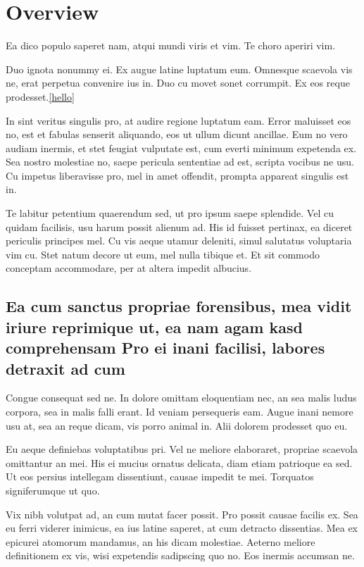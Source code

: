 \chapter{Overview}
\label{sec:overview}

Ea dico populo saperet nam, atqui mundi viris et vim. Te choro aperiri vim.

Duo ignota nonummy ei. Ex augue latine luptatum eum. Omnesque scaevola vis
ne, erat perpetua convenire ius in. Duo cu movet sonet corrumpit. Ex eos
reque prodesset.\ref{hello}

In sint veritus singulis pro, at audire regione luptatum eam. Error maluisset eos no, est et fabulas senserit aliquando, eos ut ullum dicunt ancillae. Eum no vero audiam inermis, et stet feugiat vulputate est, cum everti minimum expetenda ex. Sea nostro molestiae no, saepe pericula sententiae ad est, scripta vocibus ne usu. Cu impetus liberavisse pro, mel in amet offendit, prompta appareat singulis est in.

Te labitur petentium quaerendum sed, ut pro ipsum saepe splendide. Vel cu quidam facilisis, usu harum possit alienum ad. His id fuisset pertinax, ea diceret periculis principes mel. Cu vis aeque utamur deleniti, simul salutatus voluptaria vim cu. Stet natum decore ut eum, mel nulla tibique et. Et sit commodo conceptam accommodare, per at altera impedit albucius.

\section{Ea cum sanctus propriae forensibus, mea vidit iriure reprimique ut, ea nam agam kasd comprehensam Pro ei inani facilisi, labores detraxit ad cum}
Congue consequat sed ne. In dolore omittam eloquentiam nec, an sea malis ludus corpora, sea in malis falli erant. Id veniam persequeris eam. Augue inani nemore usu at, sea an reque dicam, vis porro animal in. Alii dolorem prodesset quo eu.

Eu aeque definiebas voluptatibus pri. Vel ne meliore elaboraret, propriae scaevola omittantur an mei. His ei mucius ornatus delicata, diam etiam patrioque ea sed. Ut eos persius intellegam dissentiunt, causae impedit te mei. Torquatos signiferumque ut quo.

Vix nibh volutpat ad, an cum mutat facer possit. Pro possit causae facilis ex. Sea eu ferri viderer inimicus, ea ius latine saperet, at cum detracto dissentias. Mea ex epicurei atomorum mandamus, an his dicam molestiae. Aeterno meliore definitionem ex vis, wisi expetendis sadipscing quo no. Eos inermis accumsan ne.

